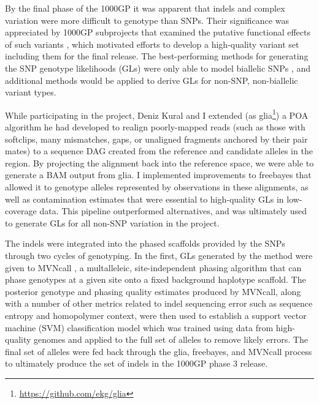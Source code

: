 By the final phase of the 1000GP \cite{1000g2015} it was apparent that indels and complex variation were more difficult to genotype than SNPs.
Their significance was appreciated by 1000GP subprojects that examined the putative functional effects of such variants \cite{challis2015distribution}, which motivated efforts to develop a high-quality variant set including them for the final release.
The best-performing methods for generating the SNP genotype likelihoods (GLs) were only able to model biallelic SNPs \cite{snptools}, and additional methods would be applied to derive GLs for non-SNP, non-biallelic variant types.

While participating in the project, Deniz Kural and I extended (as glia\footnote{\url{https://github.com/ekg/glia}}) a POA algorithm he had developed to realign poorly-mapped reads (such as those with softclips, many mismatches, gaps, or unaligned fragments anchored by their pair mates) to a sequence DAG created from the reference and candidate alleles in the region.
By projecting the alignment back into the reference space, we were able to generate a BAM output from glia.
I implemented improvements to freebayes that allowed it to genotype alleles represented by observations in these alignments, as well as contamination estimates that were essential to high-quality GLs in low-coverage data.
This pipeline outperformed alternatives, and was ultimately used to generate GLs for all non-SNP variation in the project.

The indels were integrated into the phased scaffolds provided by the SNPs through two cycles of genotyping.
In the first, GLs generated by the method were given to MVNcall \cite{menelaou2012genotype}, a multalleleic, site-independent phasing algorithm that can phase genotypes at a given site onto a fixed background haplotype scaffold.
The posterior genotype and phasing quality estimates produced by MVNcall, along with a number of other metrics related to indel sequencing error such as sequence entropy and homopolymer context, were then used to establish a support vector machine (SVM) classification model which was trained using data from high-quality genomes and applied to the full set of alleles to remove likely errors.
The final set of alleles were fed back through the glia, freebayes, and MVNcall process to ultimately produce the set of indels in the 1000GP phase 3 release.


